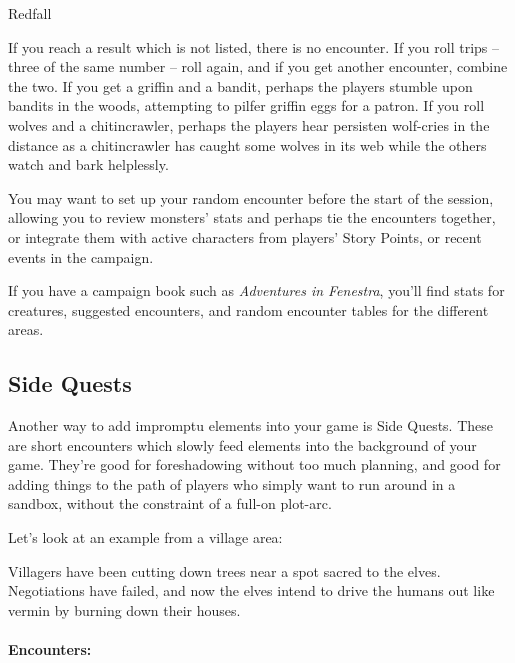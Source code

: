 \begin{multicols}{2}
\begin{encounters}{Redfall}
\end{encounters}

If you reach a result which is not listed, there is no encounter.
If you roll trips -- three of the same number -- roll again, and if you get another encounter, combine the two.
If you get a griffin and a bandit, perhaps the players stumble upon bandits in the woods, attempting to pilfer griffin eggs for a patron.
If you roll wolves and a chitincrawler, perhaps the players hear persisten wolf-cries in the distance as a chitincrawler has caught some wolves in its web while the others watch and bark helplessly.

You may want to set up your random encounter before the start of the session, allowing you to review monsters' stats and perhaps tie the encounters together, or integrate them with active characters from players' Story Points, or recent events in the campaign.

If you have a campaign book such as \textit{Adventures in Fenestra}, you'll find stats for creatures, suggested encounters, and random encounter tables for the different areas.

\subsection{Side Quests}\label{sidequests}

Another way to add impromptu elements into your game is Side Quests.
These are short encounters which slowly feed elements into the background of your game.
They're good for foreshadowing without too much planning, and good for adding things to the path of players who simply want to run around in a sandbox, without the constraint of a full-on plot-arc.

Let's look at an example from a village area:

\begin{exampletext}

	Villagers have been cutting down trees near a spot sacred to the elves.
	Negotiations have failed, and now the elves intend to drive the humans out like vermin by burning down their houses.

\end{exampletext}

\paragraph{Encounters:}

\begin{enumerate}


\end{enumerate}
\end{multicols}
